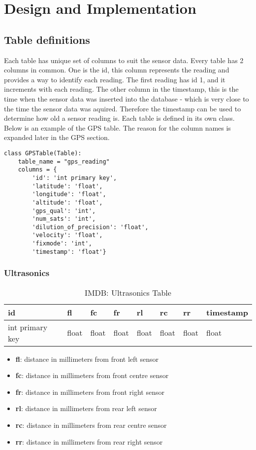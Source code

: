 \section{Design and Implementation}

\subsection{Table definitions}
Each table has unique set of columns to suit the sensor data.
Every table has 2 columns in common. One is the id, this column represents the reading and provides a way to identify each reading. The first reading has id 1, and it increments with each reading. The other column in the timestamp, this is the time when the sensor data was inserted into the database - which is very close to the time the sensor data was aquired. Therefore the timestamp can be used to determine how old a sensor reading is.
\newline
Each table is defined in its own class.
Below is an example of the GPS table. The reason for the column names is expanded later in the GPS section.
\begin{lstlisting}[style=custompython]
class GPSTable(Table):
    table_name = "gps_reading"
    columns = {
        'id': 'int primary key',
        'latitude': 'float',
        'longitude': 'float',
        'altitude': 'float',
        'gps_qual': 'int',
        'num_sats': 'int',
        'dilution_of_precision': 'float',
        'velocity': 'float',
        'fixmode': 'int',
        'timestamp': 'float'}
\end{lstlisting}


\subsubsection{Ultrasonics}

\begin{table}[!htb]
\centering
\begin{tabular}{|l|l|l|l|l|l|l|l|}
\hline
id              & fl    & fc    & fr    & rl    & rc    & rr    & timestamp \\ \hline
int primary key & float & float & float & float & float & float & float \\ \hline
\end{tabular}
\caption{IMDB: Ultrasonics Table}
\label{tab:db-ultrasonics}
\end{table}


\begin{itemize}
\item{\textbf{fl}}: distance in millimeters from front left sensor
\item{\textbf{fc}}: distance in millimeters from  front centre sensor
\item{\textbf{fr}}: distance in millimeters from  front right sensor
\item{\textbf{rl}}: distance in millimeters from rear left sensor
\item{\textbf{rc}}: distance in millimeters from rear centre sensor
\item{\textbf{rr}}: distance in millimeters from rear right sensor
\end{itemize}

